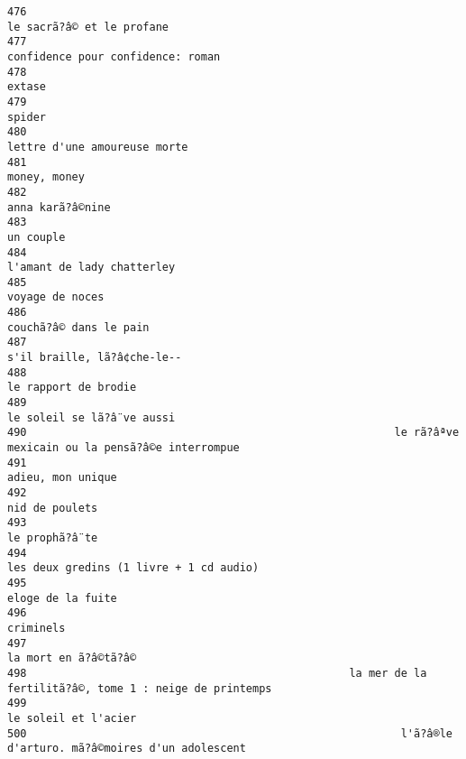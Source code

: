\documentclass[
]{report}
\begin{document}
\begin{verbatim}
476                                                                               le sacrã?â© et le profane
477                                                                       confidence pour confidence: roman
478                                                                                                  extase
479                                                                                                  spider
480                                                                            lettre d'une amoureuse morte
481                                                                                            money, money
482                                                                                        anna karã?â©nine
483                                                                                               un couple
484                                                                              l'amant de lady chatterley
485                                                                                         voyage de noces
486                                                                                  couchã?â© dans le pain
487                                                                             s'il braille, lã?â¢che-le--
488                                                                                    le rapport de brodie
489                                                                              le soleil se lã?â¨ve aussi
490                                                         le rã?âªve mexicain ou la pensã?â©e interrompue
491                                                                                       adieu, mon unique
492                                                                                          nid de poulets
493                                                                                          le prophã?â¨te
494                                                                 les deux gredins (1 livre + 1 cd audio)
495                                                                                       eloge de la fuite
496                                                                                               criminels
497                                                                                    la mort en ã?â©tã?â©
498                                                  la mer de la fertilitã?â©, tome 1 : neige de printemps
499                                                                                    le soleil et l'acier
500                                                          l'ã?â®le d'arturo. mã?â©moires d'un adolescent

\end{verbatim}
\end{document}
